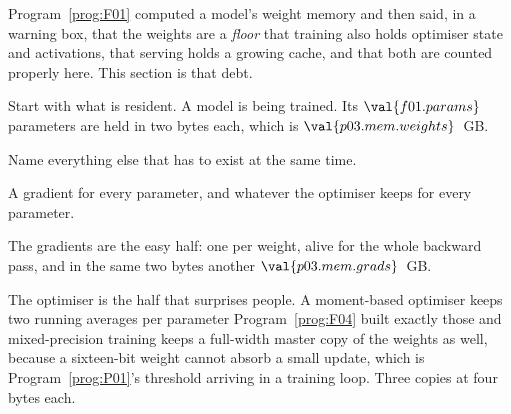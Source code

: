 \begin{fr}
Program~\ref{prog:F01} computed a model's weight memory and then said, in a
warning box, that the weights are a \emph{floor} \dash{} that training also
holds optimiser state and activations, that serving holds a growing cache, and
that both are counted properly here. This section is that debt.

Start with what is resident. A model is being trained. Its
$\val{f01.params}$ parameters are held in two bytes each, which is
$\val{p03.mem.weights}$~GB.

Name everything else that has to exist at the same time.
\nextframe
\end{fr}

\begin{fr}
\begin{ansblock}
A gradient for every parameter, and whatever the optimiser keeps for every
parameter.
\end{ansblock}

The gradients are the easy half: one per weight, alive for the whole backward
pass, and in the same two bytes \dash{} another
$\val{p03.mem.grads}$~GB.

The optimiser is the half that surprises people. A moment-based optimiser keeps
two running averages per parameter \dash{} Program~\ref{prog:F04} built exactly
those \dash{} and mixed-precision training keeps a full-width master copy of
the weights as well, because a sixteen-bit weight cannot absorb a small update,
which is Program~\ref{prog:P01}'s threshold arriving in a training loop. Three
copies at four bytes each.
\end{fr}


